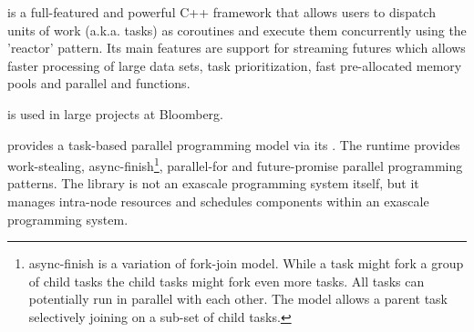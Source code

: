 \cite{bbquantum} is a full-featured and
powerful C++ framework that allows users to dispatch units of work (a.k.a.
tasks) as coroutines and execute them concurrently using the 'reactor' pattern.
Its main features are support for streaming futures which allows faster processing
of large data sets, task prioritization, fast pre-allocated memory pools and
parallel  and  functions.

\bbquantum\xspace is used in large projects at Bloomberg.

provides a task-based parallel programming model via its \hclib\cite{hclib}.
The runtime provides work-stealing, async-finish\footnote{async-finish is a
variation of fork-join model. While a task might fork a group of
child tasks the child tasks might fork even more tasks. All tasks can
potentially run in parallel with each other. The model allows a parent task
selectively joining on a sub-set of child tasks.},
parallel-for and future-promise parallel programming patterns. The library is not an exascale
programming system itself, but it manages intra-node resources and schedules
components within an exascale programming system.

